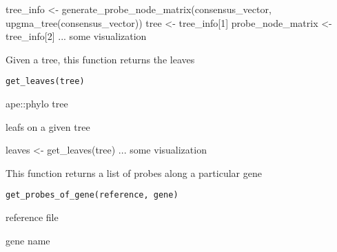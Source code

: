 \documentclass[a4paper]{book}
\begin{document}
%
\begin{Examples}
\begin{ExampleCode}
tree_info <- generate_probe_node_matrix(consensus_vector, 
upgma_tree(consensus_vector))
tree <- tree_info[1]
probe_node_matrix <- tree_info[2]
... some visualization 
\end{ExampleCode}
\end{Examples}
%
\begin{Description}\relax
Given a tree, this function returns the leaves
\end{Description}
%
\begin{Usage}
\begin{verbatim}
get_leaves(tree)
\end{verbatim}
\end{Usage}
%
\begin{Arguments}
\begin{ldescription}
\item[\code{tree}] ape::phylo tree
\end{ldescription}
\end{Arguments}
%
\begin{Value}
leafs on a given tree
\end{Value}
%
\begin{Examples}
\begin{ExampleCode}
leaves <- get_leaves(tree)
... some visualization 
\end{ExampleCode}
\end{Examples}
%
\begin{Description}\relax
This function returns a list of probes along a particular gene
\end{Description}
%
\begin{Usage}
\begin{verbatim}
get_probes_of_gene(reference, gene)
\end{verbatim}
\end{Usage}
%
\begin{Arguments}
\begin{ldescription}
\item[\code{reference}] reference file

\item[\code{gene}] gene name
\end{ldescription}
\end{Arguments}
\end{document}
